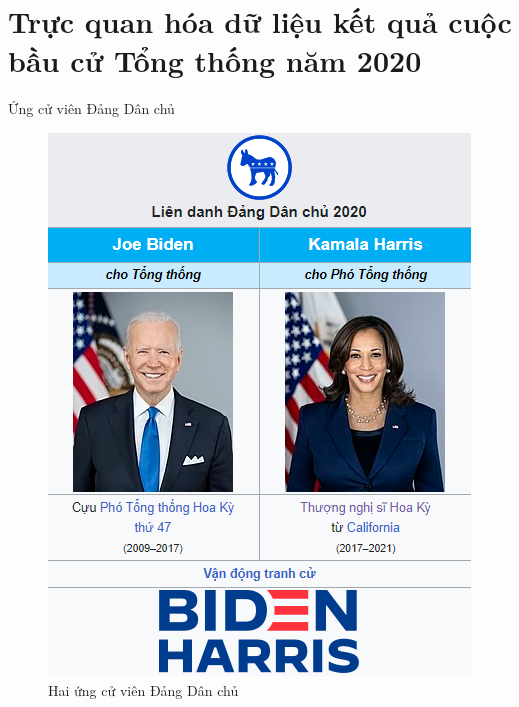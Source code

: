 \documentclass[10pt]{beamer}
\theoremstyle{remark}
\theoremstyle{definition}
\begin{document}
\section{Trực quan hóa dữ liệu kết quả cuộc bầu cử Tổng thống năm 2020}

\begin{frame}{Ứng cử viên Đảng Dân chủ}
    \begin{figure}[h!]
        \centering
        \includegraphics[height=0.8\textheight]{figures/Dem_Candidates.png}
        \caption{Hai ứng cử viên Đảng Dân chủ}
    \end{figure}
\end{frame}
\end{document}
